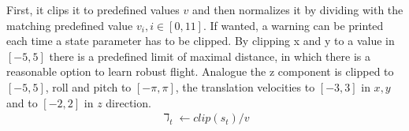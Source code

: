 First, it clips it to predefined values $v$ and then normalizes it by dividing with the matching predefined value $v_i, i\in[0,11]$. 
If wanted, a warning can be printed each time a state parameter has to be clipped. 
By clipping x and y to a value in $[-5,5]$ there is a predefined limit of maximal distance, in which there is a reasonable option to learn robust flight. 
Analogue the z component is clipped to $[-5,5]$, roll and pitch to $[-\pi, \pi]$, the translation velocities to $[-3, 3]$ in $x, y$ and to $[-2,2]$ in $z$ direction. 
\newline
\begin{align}
	\daleth_t \leftarrow clip(s_t) / v \label{eq:clipnorm}
\end{align}
\newline

\newpage

